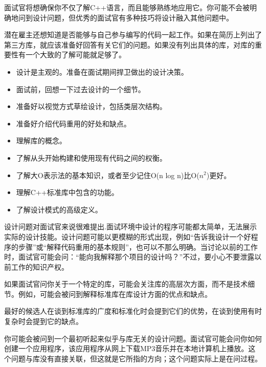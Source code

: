 
面试官将想确保你不仅了解C++语言，而且能够熟练地应用它。你可能不会被明确地问到设计问题，但优秀的面试官有多种技巧将设计融入其他问题中。

潜在雇主还想知道是否能够与自己参与编写的代码一起工作。如果在简历上列出了第三方库，就应该准备好回答有关它们的问题。如果没有列出具体的库，对库的重要性有一个大致的了解可能就足够了。


\begin{itemize}
\item
设计是主观的。准备在面试期间捍卫做出的设计决策。

\item
面试前，回想一下过去设计的一个细节。

\item
准备好以视觉方式草绘设计，包括类层次结构。

\item
准备好介绍代码重用的好处和缺点。

\item
理解库的概念。

\item
了解从头开始构建和使用现有代码之间的权衡。

\item
了解大O表示法的基本知识，或者至少记住O(n log n)比O($n^2$)更好。

\item
理解C++标准库中包含的功能。

\item
了解设计模式的高级定义。
\end{itemize}


设计问题对面试官来说很难提出.面试环境中设计的程序可能都太简单，无法展示实际的设计技能。设计问题可能以更模糊的形式出现，例如“告诉我设计一个好程序的步骤”或“解释代码重用的基本规则”，也可以不那么明确。当讨论以前的工作时，面试官可能会问：“能向我解释那个项目的设计吗？”不过，要小心不要泄露以前工作的知识产权。

如果面试官问你关于一个特定的库，可能会关注库的高层次方面，而不是技术细节。例如，可能会被问到解释标准库在库设计方面的优点和缺点。

最好的候选人在谈到标准库的广度和标准化时会提到它们的优势，在谈到使用有时复杂时会提到它的缺点。

你可能会被问到一个最初听起来似乎与库无关的设计问题。面试官可能会问你如何创建一个应用程序，该应用程序从网上下载MP3音乐并在本地计算机上播放。这个问题与库没有直接关联，但这就是它所指的方向；这个问题实际上是在问过程。

